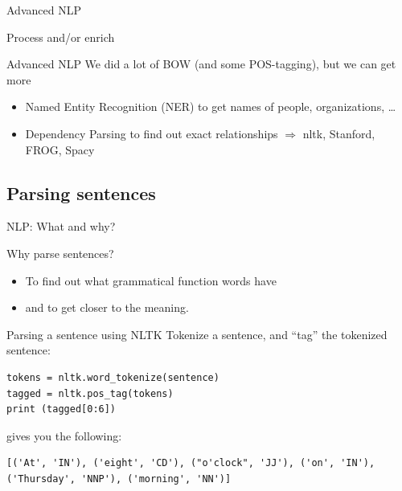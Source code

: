 \documentclass[handout]{beamer}
\begin{document}
\begin{section}{Advanced NLP}
	
	\begin{frame}{Process and/or enrich}
	\begin{block}{Advanced NLP}
		We did a lot of BOW (and some POS-tagging), but we can get more
		\begin{itemize}
			\item Named Entity Recognition (NER) to get names of people, organizations, \ldots
			\item Dependency Parsing to find out exact relationships
			$\Rightarrow$ nltk, Stanford, FROG, Spacy
		\end{itemize}
	\end{block}
\end{frame}


%


\subsection{Parsing sentences}
\begin{frame}{NLP: What and why?}
\begin{block}{Why parse sentences?}
\begin{itemize}
	\item To find out what grammatical function words have
	\item and to get closer to the meaning.
\end{itemize}
\end{block}
\end{frame}



\begin{frame}[fragile]{Parsing a sentence using NLTK}
Tokenize a sentence, and ``tag'' the tokenized sentence:
\begin{lstlisting}
tokens = nltk.word_tokenize(sentence)
tagged = nltk.pos_tag(tokens)
print (tagged[0:6])
\end{lstlisting}
gives you the following:
\begin{lstlisting}
[('At', 'IN'), ('eight', 'CD'), ("o'clock", 'JJ'), ('on', 'IN'),
('Thursday', 'NNP'), ('morning', 'NN')]
\end{lstlisting}


\end{frame}
\end{section}
\end{document}
